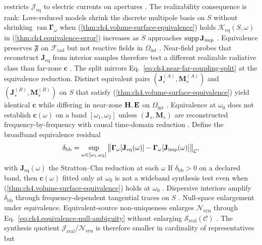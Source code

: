 restricts \(\mathcal{J}_{\mathrm{eq}}\) to electric currents on apertures . The
realizability consequence is rank: Love-reduced models shrink the discrete multipole basis on \(S\) without shrinking
\(\operatorname{ran}\boldsymbol{\Gamma}_\omega\) when (\ref{thm:ch4.volume-surface-equivalence}) holds
\label{lem:ch4.equivalence-proximity}
\(\mathcal{K}_{\mathrm{eq}}(S,\omega)\) in (\ref{thm:ch4.equivalence-error}) increases as \(S\) approaches
\(\operatorname{supp}\mathbf{J}_{\mathrm{imp}}\) .
Equivalence preserves \(\mathfrak{F}\) on \(\mathcal{F}_{\mathrm{rad}}\) but not reactive fields in
\(\Omega_{\mathrm{int}}\) . Near-field probes that reconstruct \(\mathbf{J}_{\mathrm{eq}}\) from
interior samples therefore test a different realizable radiative class than far-zone \(\mathbf{c}\)
. The split mirrors Eq.~\eqref{eq:ch4.near-far-coupling-split} at the equivalence reduction.
\label{cor:ch4.far-insensitivity-equivalence}
Distinct equivalent pairs \((\mathbf{J}_{s}^{(A)},\mathbf{M}_{s}^{(A)})\) and
\((\mathbf{J}_{s}^{(B)},\mathbf{M}_{s}^{(B)})\) on \(S\) that satisfy
(\ref{thm:ch4.volume-surface-equivalence}) yield identical \(\mathbf{c}\) while differing in near-zone
\(\mathbf{H},\mathbf{E}\) on \(\Omega_{\mathrm{int}}\) .
Equivalence at \(\omega_{0}\) does not establish \(\mathbf{c}(\omega)\) on a band \([\omega_{1},\omega_{2}]\) unless
\((\mathbf{J}_{s},\mathbf{M}_{s})\) are reconstructed frequency-by-frequency with causal time-domain reduction
. Define the broadband equivalence residual
\begin{equation}
\label{eq:ch4.broadband-equivalence-residual}
\delta_{\mathrm{bb}}
=
\sup_{\omega\in[\omega_{1},\omega_{2}]}
\big\|
\boldsymbol{\Gamma}_\omega[\mathbf{J}_{\mathrm{eq}}(\omega)]
-
\boldsymbol{\Gamma}_\omega[\mathbf{J}_{\mathrm{imp}}(\omega)]
\big\|_{\mathcal{C}},
\end{equation}
with \(\mathbf{J}_{\mathrm{eq}}(\omega)\) the Stratton--Chu reduction at each \(\omega\)
\label{cor:ch4.single-freq-equivalence-trap}
If \(\delta_{\mathrm{bb}}>0\) on a declared band, then \(\mathbf{c}(\omega)\) fitted only at \(\omega_{0}\) is not a
wideband synthesis test even when (\ref{thm:ch4.volume-surface-equivalence}) holds at \(\omega_{0}\)
. Dispersive interiors amplify \(\delta_{\mathrm{bb}}\) through
frequency-dependent tangential traces on \(S\) .
Null-space enlargement under equivalence. Equivalent-source non-uniqueness enlarges \(\mathcal{N}_{\mathrm{syn}}\) through
Eq.~\eqref{eq:ch4.equivalence-null-ambiguity} without enlarging \(\mathcal{S}_{\mathrm{real}}(\mathcal{C})\)
. The synthesis quotient
\(\mathcal{J}_{\mathrm{real}}/\mathcal{N}_{\mathrm{syn}}\) is therefore smaller in cardinality of representatives but
